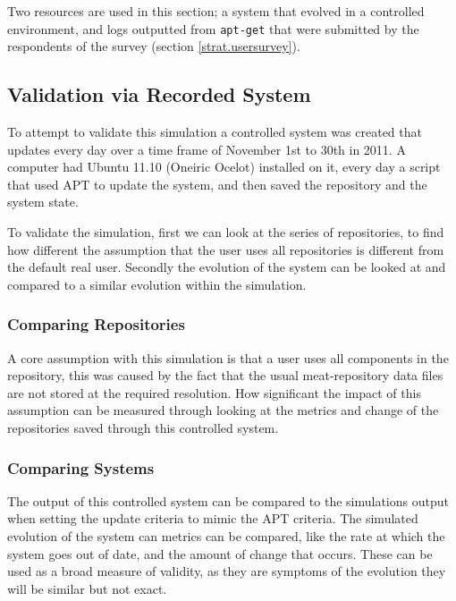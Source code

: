 Two resources are used in this section; a system that evolved in a controlled environment,
 and logs outputted from \texttt{apt-get} that were submitted by the respondents of the survey (section \ref{strat.usersurvey}).


\subsection{Validation via Recorded System}
To attempt to validate this simulation a controlled system was created that updates every day over a time frame of November 1st to 30th in 2011.
A computer had Ubuntu 11.10 (Oneiric Ocelot) installed on it, every day a script that used APT to update the system, and then saved the repository and the system state.

To validate the simulation, first we can look at the series of repositories, to find how different the assumption that the user uses all repositories is different from the default real user.
Secondly the evolution of the system can be looked at and compared to a similar evolution within the simulation.

\subsubsection{Comparing Repositories}
A core assumption with this simulation is that a user uses all components in the repository, 
this was caused by the fact that the usual meat-repository data files are not stored at the required resolution.
How significant the impact of this assumption can be measured through looking at the metrics and change of the repositories saved through this controlled system.


\subsubsection{Comparing Systems}
The output of this controlled system can be compared to the simulations output when setting the update criteria to mimic the APT criteria.
The simulated evolution of the system can metrics can be compared, like the rate at which the system goes out of date, and the amount of change that occurs.
These can be used as a broad measure of validity, as they are symptoms of the evolution they will be similar but not exact.

